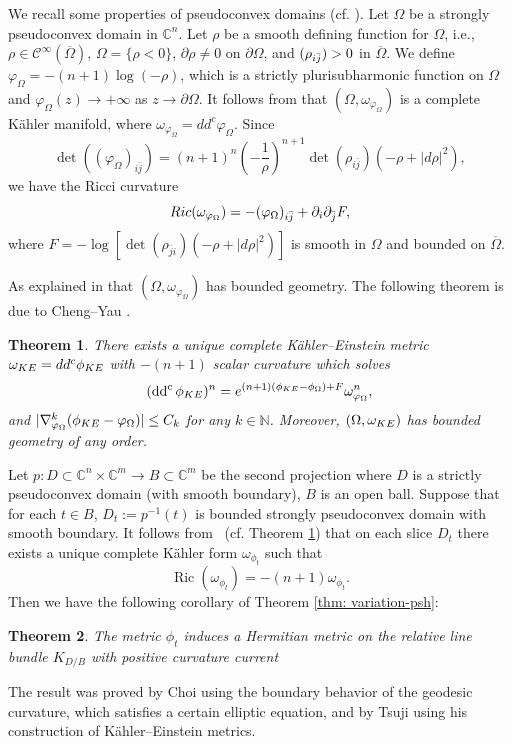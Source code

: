 \documentclass[a4paper, 11pt]{amsart}
\theoremstyle{plain}
\newtheorem{theorem}{Theorem}[section]
\numberwithin{equation}{section} %
\numberwithin{figure}{section} %
\theoremstyle{plain}
\theoremstyle{plain}
\theoremstyle{plain}
\theoremstyle{plain}
\theoremstyle{remark}
\theoremstyle{definition}
\theoremstyle{definition}
\DeclareMathOperator \Ric {\textrm{Ric}}
\DeclareMathOperator \ddc{\textrm{dd}^c}
\begin{document}
We recall some properties of pseudoconvex domains (cf. \cite{ChengYau80-complete}).  Let $\Omega$ be a strongly pseudoconvex domain in $\mathbb{C}^n$.  Let $\rho$ be a smooth defining function for $\Omega$, i.e., $\rho\in\mathcal{C}^\infty(\overline{\Omega})$, $\Omega=\{\rho<0\}$, $\partial\rho\neq 0$ on $\partial\Omega$, and $(\rho_{i\Bar{j}})>0$ in $\overline\Omega$.  We define $\varphi_\Omega = -(n+1)\log (-\rho)$, which is a strictly plurisubharmonic function on $\Omega$ and $\varphi_\Omega(z) \rightarrow +\infty$ as $z\rightarrow \partial \Omega$.  It follows from \cite{ChengYau80-complete} that  $(\Omega, \omega_{\varphi_\Omega
}) $ is a complete K\"ahler manifold, where $\omega_{\varphi_\Omega}= dd^c\varphi_\Omega$. Since 
$$\det ((\varphi_\Omega)_{i\bar j }) = (n+1)^n \left(-\frac{1}{\rho}\right)^{n+1} \det(\rho_{i\bar j })(-\rho +|d\rho|^2),$$
 we have the Ricci curvature
$${\rm Ric}(\omega_{\varphi_\Omega}) = - (\varphi_\Omega)_{i\bar j }+ \partial_i\partial_{\bar j}F ,$$
where  $F=-\log [\det(\rho_{\bar j i})(-\rho +|d\rho|^2)]$ is smooth  in $\Omega$ and bounded on $\overline \Omega$.  

\medskip
As explained in \cite{ChengYau80-complete} that $(\Omega, \omega_{\varphi_\Omega})$  has bounded geometry. The following theorem is due to Cheng--Yau \cite{ChengYau80-complete,  Mok-Yau83-completeness}.
\begin{theorem}
\label{thm_CY}
There exists  a unique complete K\"ahler--Einstein metric $\omega_{\rm KE}=dd^c\phi_{\rm KE}$ with $-(n+1)$ scalar curvature
which solves
\begin{eqnarray}
\label{KE_eq}
(\ddc \phi_{\rm KE})^n= e^{(n+1)(\phi_{\rm KE} -\phi_\Omega)
+F}\omega_{\varphi_\Omega}^n,
\end{eqnarray}
and $|\nabla^k_{\varphi_\Omega}( \phi_{\rm KE}-\varphi_\Omega) |\leq C_k$ for any $k\in \mathbb{N}$.
Moreover, $(\Omega, \omega_{\rm KE})$ has bounded geometry of any order.
\end{theorem}

Let $p:D\subset\mathbb{C}^{n}\times\mathbb{C}^m\to B\subset \mathbb{C}^m$ be the second projection where $D$ is a strictly pseudoconvex domain (with smooth boundary), $B$ is an open ball. Suppose that for each $t\in B$, $D_t:=p^{-1}(t)$  is bounded strongly pseudoconvex domain with
smooth boundary. It follows from~\cite{ChengYau80-complete,  Mok-Yau83-completeness} (cf. Theorem \ref{thm_CY}) that on each
 slice $D_t$ there exists a unique complete K\"ahler form $\omega_{\phi_t}$ such that 
\[ \Ric(\omega_{\phi_t})=-(n+1)\omega_{\phi_t}.\]
Then we  have the  following corollary of Theorem \ref{thm: variation-psh}:
\begin{theorem}\label{thm_var_psh_domain}
    The metric $\phi_t$ induces a Hermitian metric on the relative line bundle $K_{D/B}$ with positive curvature current 
\end{theorem}
The result was proved by  Choi \cite{Choi15-variations-pseudoconvex,Choi15-study} using the boundary behavior of the geodesic curvature, which satisfies a certain elliptic equation, and by  Tsuji \cite{Tsuji13-construction-KE-pseudoconvex} using his construction of K\"ahler--Einstein metrics. 
\end{document}
